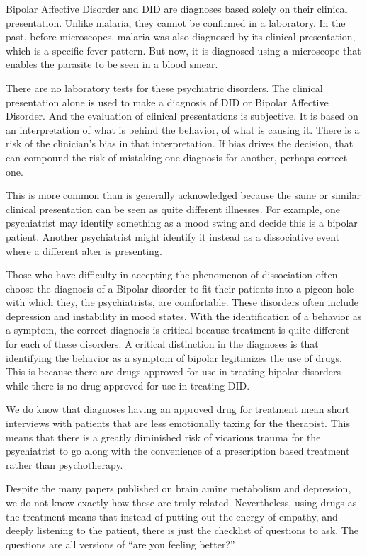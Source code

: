\documentclass[]{book}
\begin{document}
Bipolar Affective Disorder and DID are diagnoses based solely on their clinical presentation. Unlike malaria, they cannot be confirmed in a laboratory. In the past, before microscopes, malaria was also diagnosed by its clinical presentation, which is a specific fever pattern. But now, it is diagnosed using a microscope that enables the parasite to be seen in a blood smear.

There are no laboratory tests for these psychiatric disorders. The clinical presentation alone is used to make a diagnosis of DID or Bipolar Affective Disorder. And the evaluation of clinical presentations is subjective. It is based on an interpretation of what is behind the behavior, of what is causing it. There is a risk of the clinician's bias in that interpretation. If bias drives the decision, that can compound the risk of mistaking one diagnosis for another, perhaps correct one.

This is more common than is generally acknowledged because the same or similar clinical presentation can be seen as quite different illnesses. For example, one psychiatrist may identify something as a mood swing and decide this is a bipolar patient. Another psychiatrist might identify it instead as a dissociative event where a different alter is presenting.

Those who have difficulty in accepting the phenomenon of dissociation often choose the diagnosis of a Bipolar disorder to fit their patients into a pigeon hole with which they, the psychiatrists, are comfortable. These disorders often include depression and instability in mood states. With the identification of a behavior as a symptom, the correct diagnosis is critical because treatment is quite different for each of these disorders. A critical distinction in the diagnoses is that identifying the behavior as a symptom of bipolar legitimizes the use of drugs. This is because there are drugs approved for use in treating bipolar disorders while there is no drug approved for use in treating DID.

We do know that diagnoses having an approved drug for treatment mean short interviews with patients that are less emotionally taxing for the therapist. This means that there is a greatly diminished risk of vicarious trauma for the psychiatrist to go along with the convenience of a prescription based treatment rather than psychotherapy.

Despite the many papers published on brain amine metabolism and depression, we do not know exactly how these are truly related. Nevertheless, using drugs as the treatment means that instead of putting out the energy of empathy, and deeply listening to the patient, there is just the checklist of questions to ask. The questions are all versions of ``are you feeling better?''
\end{document}
